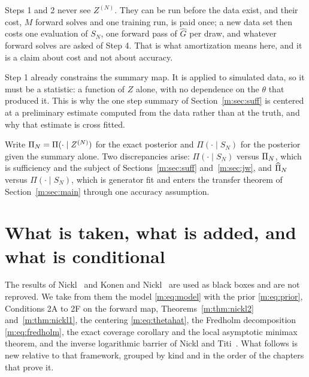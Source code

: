 Steps 1 and 2 never see $Z^{(N)}$. They can be run before the data exist, and their cost, $M$ forward solves and one training run, is paid once; a new data set then costs one evaluation of $S_N$, one forward pass of $\widehat G$ per draw, and whatever forward solves are asked of Step 4. That is what amortization means here, and it is a claim about cost and not about accuracy.

Step 1 already constrains the summary map. It is applied to simulated data, so it must be a statistic: a function of $Z$ alone, with no dependence on the $\theta$ that produced it. This is why the one step summary of Section~\ref{m:sec:suff} is centered at a preliminary estimate computed from the data rather than at the truth, and why that estimate is cross fitted.

Write $\Pi_N=\Pi(\cdot\mid Z^{(N)})$ for the exact posterior and $\Pi(\cdot\mid S_N)$ for the posterior given the summary alone. Two discrepancies arise: $\Pi(\cdot\mid S_N)$ versus $\Pi_N$, which is sufficiency and the subject of Sections~\ref{m:sec:suff} and~\ref{m:sec:jw}, and $\widehat\Pi_N$ versus $\Pi(\cdot\mid S_N)$, which is generator fit and enters the transfer theorem of Section~\ref{m:sec:main} through one accuracy assumption.

\section{What is taken, what is added, and what is conditional}\label{m:sec:contrib}

The results of Nickl~\cite{nicklbvm2024} and Konen and Nickl~\cite{konennickl2026} are used as black boxes and are not reproved. We take from them the model \eqref{m:eq:model} with the prior \eqref{m:eq:prior}, Conditions 2A to 2F on the forward map, Theorems~\ref{m:thm:nickl2} and~\ref{m:thm:nickl1}, the centering \eqref{m:eq:thetahat}, the Fredholm decomposition \eqref{m:eq:fredholm}, the exact coverage corollary and the local asymptotic minimax theorem, and the inverse logarithmic barrier of Nickl and Titi~\cite{nickltiti2024}. What follows is new relative to that framework, grouped by kind and in the order of the chapters that prove it.

